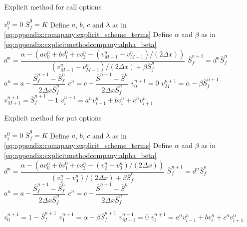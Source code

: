 \begin{algorithm}[H]
    \caption{Explicit method for call options}\label{alg:appendix:companytransformation:explicits:call_explicit_method_algorithm}
    \begin{algorithmic}
      \State $v^{0}_i = 0 $
    \EndFor
    \State $\bar{S}_{f}^{0} = K$
    \State Define $a$, $b$, $c$ and $\lambda$ as in \eqref{eq:appendix:comapany:explicit_scheme_terms}
    \State Define $\alpha$ and $\beta$ as in \eqref{eq:appendix:explicitmethodcompany:alpha_beta}
      \State $d^n = \dfrac{\alpha - (av^{n}_{0} + bv^{0}_{1} + cv^{n}_{2} - (v^{n}_{M+1} - v^{n}_{M-1})/(2\Delta{x}))}{(v^{n}_{M+1} - v^{n}_{M-1})/(2\Delta{x}) + \beta\bar{S}^{n}_f}$
      \State $\bar{S}^{n+1}_{f}=d^{n}\bar{S}^{n}_{f}$
      \State $a^{n} = a - \dfrac{\bar{S}^{n+1}_{f} - \bar{S}^{n}_{f}}{2\Delta{x}\bar{S}^{n}_{f}}$
      \State $c^{n} = c - \dfrac{\bar{S}^{n+1} - \bar{S}^{n}}{2\Delta{x}\bar{S}^{n}_{f}}$
      \State $v^{n+1}_{0}= 0$
      \State $v^{n+1}_{M}=\alpha - \beta\bar{S}^{n+1}_{f}$
      \State $v^{n+1}_{M+1} =\bar{S}^{n+1}_{f} - 1$
        \State $v^{n+1}_{i} = a^{n} v^{n}_{i-1} + b v^{n}_{i} + c^{n}v^{n}_{i+1}$
      \EndFor
    \EndFor
  \end{algorithmic}
  \end{algorithm}

\begin{algorithm}[H]
    \caption{Explicit method for put options}\label{alg:appendix:companytransformation:explicits:put_explicit_method_algorithm}
    \begin{algorithmic}
      \State $v^{0}_i = 0 $
    \EndFor
    \State $\bar{S}_{f}^{0} = K$
    \State Define $a$, $b$, $c$ and $\lambda$ as in \eqref{eq:appendix:comapany:explicit_scheme_terms}
    \State Define $\alpha$ and $\beta$ as in \eqref{eq:appendix:explicitmethodcompany:alpha_beta}
      \State $d^n = \dfrac{\alpha - (av^{n}_{0} + bv^{0}_{1} + cv^{n}_{2} - (v^{n}_{2} - v^{n}_{0})/(2\Delta{x}))}{(v^{n}_{2} - v^{n}_{0})/(2\Delta{x}) + \beta\bar{S}^{n}_f}$
      \State $\bar{S}^{n+1}_{f}=d^{n}\bar{S}^{n}_{f}$
      \State $a^{n} = a - \dfrac{\bar{S}^{n+1}_{f} - \bar{S}^{n}_{f}}{2\Delta{x}\bar{S}^{n}_{f}}$
      \State $c^{n} = c - \dfrac{\bar{S}^{n+1} - \bar{S}^{n}}{2\Delta{x}\bar{S}^{n}_{f}}$

      \State $v^{n+1}_{0}=1 - \bar{S}^{n+1}_{f}$
      \State $v^{n+1}_{1}=\alpha - \beta\bar{S}^{n+1}_{f}$
      \State $v^{n+1}_{M+1} = 0$
        \State $v^{n+1}_{i} = a^{n} v^{n}_{i-1} + b v^{n}_{i} + c^{n}v^{n}_{i+1}$
      \EndFor
    \EndFor
  \end{algorithmic}
  \end{algorithm}
